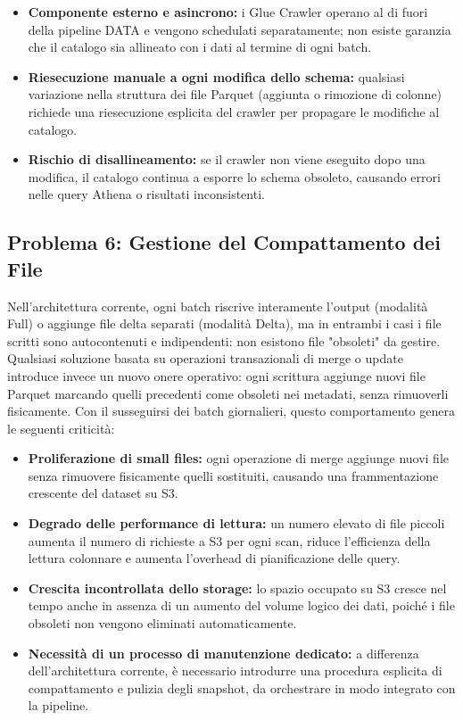 \documentclass[12pt,a4paper,openright,twoside]{book}
\begin{document}
\begin{itemize}
    \item \textbf{Componente esterno e asincrono:} i Glue Crawler operano al di fuori della pipeline DATA e vengono schedulati separatamente; non esiste garanzia che il catalogo sia allineato con i dati al termine di ogni batch.
    \item \textbf{Riesecuzione manuale a ogni modifica dello schema:} qualsiasi variazione nella struttura dei file Parquet (aggiunta o rimozione di colonne) richiede una riesecuzione esplicita del crawler per propagare le modifiche al catalogo.
    \item \textbf{Rischio di disallineamento:} se il crawler non viene eseguito dopo una modifica, il catalogo continua a esporre lo schema obsoleto, causando errori nelle query Athena o risultati inconsistenti.
\end{itemize}

\subsection{Problema 6: Gestione del Compattamento dei File}
Nell'architettura corrente, ogni batch riscrive interamente l'output (modalità Full) o aggiunge file delta separati (modalità Delta), ma in entrambi i casi i file scritti sono autocontenuti e indipendenti: non esistono file "obsoleti" da gestire. Qualsiasi soluzione basata su operazioni transazionali di merge o update introduce invece un nuovo onere operativo: ogni scrittura aggiunge nuovi file Parquet marcando quelli precedenti come obsoleti nei metadati, senza rimuoverli fisicamente. Con il susseguirsi dei batch giornalieri, questo comportamento genera le seguenti criticità:

\begin{itemize}
    \item \textbf{Proliferazione di small files:} ogni operazione di merge aggiunge nuovi file senza rimuovere fisicamente quelli sostituiti, causando una frammentazione crescente del dataset su S3.
    \item \textbf{Degrado delle performance di lettura:} un numero elevato di file piccoli aumenta il numero di richieste a S3 per ogni scan, riduce l'efficienza della lettura colonnare e aumenta l'overhead di pianificazione delle query.
    \item \textbf{Crescita incontrollata dello storage:} lo spazio occupato su S3 cresce nel tempo anche in assenza di un aumento del volume logico dei dati, poiché i file obsoleti non vengono eliminati automaticamente.
    \item \textbf{Necessità di un processo di manutenzione dedicato:} a differenza dell'architettura corrente, è necessario introdurre una procedura esplicita di compattamento e pulizia degli snapshot, da orchestrare in modo integrato con la pipeline.
\end{itemize}
\end{document}
